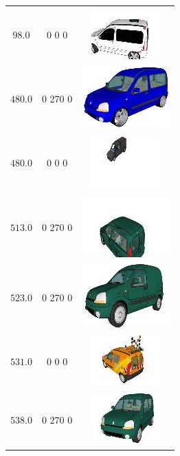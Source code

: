\begin{longtable}{ccc}
	$98.0$ & 0 0 0 & \includegraphics{models/f1ef33533b18d207d75f7835edfe1dd1.jpg}\\
	$480.0$ & 0 270 0 & \includegraphics{models/b238de109e2b8655727c10c7e3dc543b.jpg}\\
	$480.0$ & 0 0 0 & \includegraphics{models/dd64056e3160f6d74cfb219cc72c917c.jpg}\\
	$513.0$ & 0 270 0 & \includegraphics{models/13289b3906378da7fbeef30fe11d07d1.jpg}\\
	$523.0$ & 0 270 0 & \includegraphics{models/3106fd51d8c60d43a9f2f113e637c14e.jpg}\\
	$531.0$ & 0 0 0 & \includegraphics{models/260139ed1aa8394e7972d613ef8dcec9.jpg}\\
	$538.0$ & 0 270 0 & \includegraphics{models/7e1c183d478a12ecda752c779b659af8.jpg}\\

\end{longtable}

